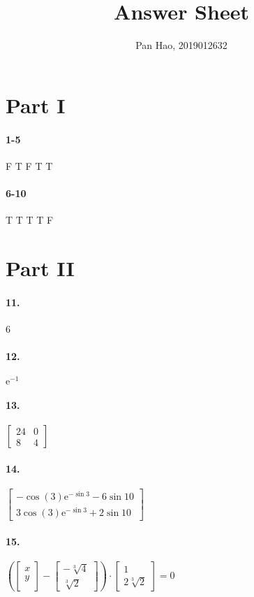 \documentclass[11pt, a4paper]{article}
\begin{document}
\title{Answer Sheet}
\author{Pan Hao, 2019012632}
\date{}
\maketitle
\section*{Part I}
\paragraph{1-5} F T F T T
\paragraph{6-10} T T T T F

\section*{Part II}
\paragraph{11.} 6
\paragraph{12.} $\mathrm{e}^{-1}$
\paragraph{13.}
$\begin{bmatrix}
    24 & 0 \\
    8 & 4
\end{bmatrix}$
\paragraph{14.}
$\begin{bmatrix}
    -\cos(3)\mathrm{e}^{-\sin 3} - 6\sin 10 \\
    3\cos(3)\mathrm{e}^{-\sin 3} + 2\sin 10
\end{bmatrix}$
\paragraph{15.}
$(\begin{bmatrix}
    x \\
    y \\
\end{bmatrix} -
\begin{bmatrix}
    -\sqrt[3]{4} \\
    \sqrt[3]{2}
\end{bmatrix}) \cdot
\begin{bmatrix}
    1 \\
    2\sqrt[3]{2}
\end{bmatrix} = 0$
\end{document}
